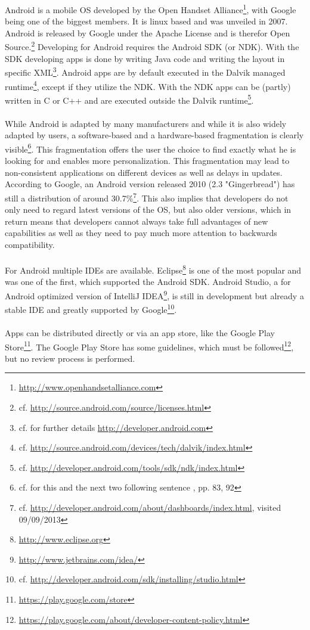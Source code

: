 \vspace{0.75em}
Android is a mobile OS developed by the Open Handset Alliance\footnote{\url{http://www.openhandsetalliance.com}}, with Google being one of the biggest members. It is linux based and was unveiled in 2007. Android is released by Google under the Apache License and is therefor Open Source.\footnote{cf. \url{http://source.android.com/source/licenses.html}} Developing for Android requires the Android SDK (or NDK). With the SDK developing apps is done by writing Java code and writing the layout in specific XML\footnote{cf. for further details \url{http://developer.android.com}}. Android apps are by default executed in the Dalvik managed runtime\footnote{cf. \url{http://source.android.com/devices/tech/dalvik/index.html}}, except if they utilize the NDK. With the NDK apps can be (partly) written in C or C++ and are executed outside the Dalvik runtime\footnote{cf. \url{http://developer.android.com/tools/sdk/ndk/index.html}}.
\\
\\
While Android is adapted by many manufacturers and while it is also widely adapted by users, a software-based and a hardware-based fragmentation is clearly visible\footnote{cf. for this and the next two following sentence \cite{DanHan.2012}, pp. 83, 92}. This fragmentation offers the user the choice to find exactly what he is looking for and enables more personalization. This fragmentation may lead to non-consistent applications on different devices as well as delays in updates. According to Google, an Android version released 2010 (2.3 "Gingerbread") has still a distribution of around 30.7\%\footnote{cf. \url{http://developer.android.com/about/dashboards/index.html}, visited 09/09/2013}. This also implies that developers do not only need to regard latest versions of the OS, but also older versions, which in return means that developers cannot always take full advantages of new capabilities as well as they need to pay much more attention to backwards compatibility.
\\
\\
For Android multiple IDEs are available. Eclipse\footnote{\url{http://www.eclipse.org}} is one of the most popular and was one of the first, which supported the Android SDK. Android Studio, a for Android optimized version of IntelliJ IDEA\footnote{\url{http://www.jetbrains.com/idea/}}, is still in development but already a stable IDE and greatly supported by Google\footnote{cf. \url{http://developer.android.com/sdk/installing/studio.html}}.
\\
\\
Apps can be distributed directly or via an app store, like the Google Play Store\footnote{\url{https://play.google.com/store}}. The Google Play Store has some guidelines, which must be followed\footnote{\url{https://play.google.com/about/developer-content-policy.html}}, but no review process is performed.

